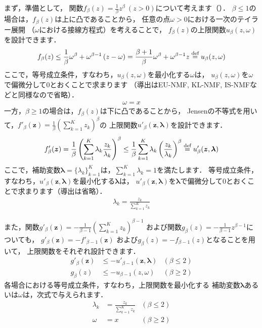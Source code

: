 まず，準備として，
関数$f_\beta(z)=\frac{1}{\beta} z^\beta \ (z > 0)$について考えます（）．
$\beta \le 1$の場合は，$f_\beta(z)$は上に凸であることから，
任意の点$\omega > 0$における一次のテイラー展開
（$\omega$における接線方程式）を考えることで，
$f_\beta(z)$の上限関数$u_\beta(z,\omega)$を設計できます．
\begin{align}
f_\beta(z)
\le
\frac{1}{\beta} \omega^\beta + \omega^{\beta - 1}\left(z - \omega\right)
=
\frac{\beta + 1}{\beta} \omega^\beta + \omega^{\beta - 1} z
\overset{\mbox{\scriptsize{def}}}{=}
u_\beta(z,\omega)
\end{align}
ここで，等号成立条件，すなわち，$u_\beta(z,\omega)$を最小化する$\omega$は，
$u_\beta(z,\omega)$を$\omega$で偏微分して$0$とおくことで求まります
（導出はEU-NMF, KL-NMF, IS-NMFなどと同様なので省略）．
\begin{align}
\omega = x
\end{align}
一方，$\beta \ge 1$の場合は，$f_\beta(z)$は下に凸であることから，
Jensenの不等式を用いて，$f'_\beta(\bm{z}) = \frac{1}{\beta} \left(\sum_{k=1}^K z_k\right)^\beta$の
上限関数$u'_\beta(\bm{z},\bm\lambda)$を設計できます．
\begin{align}
f'_\beta(\bm{z}) 
= 
\frac{1}{\beta} \left(\sum_{k=1}^K \lambda_k \frac{z_k}{\lambda_k}\right)^\beta
\le 
\frac{1}{\beta} \sum_{k=1}^K \lambda_k \left(\frac{z_k}{\lambda_k}\right)^\beta
\overset{\mbox{\scriptsize{def}}}{=}
u'_\beta(\bm{z},\bm\lambda)
\end{align}
ここで，補助変数$\bm\lambda = \{\lambda_k\}_{k=1}^K$は，$\sum_{k=1}^K \lambda_k = 1$を満たします．
等号成立条件，すなわち，$u'_\beta(\bm{z},\bm\lambda)$を最小化する$\bm\lambda$は，
$u'_\beta(\bm{z},\bm\lambda)$を$\bm\lambda$で偏微分して$0$とおくことで求まります（導出は省略）．
\begin{align}
\lambda_k = \frac{z_k}{\sum_{k=1}^K z_k}
\end{align}

また，関数$g'_\beta(\bm{z})
= - \frac{1}{\beta - 1} \left(\sum_{k=1}^K z_k\right)^{\beta - 1}$
および関数$g_\beta(z) = - \frac{1}{\beta - 1} z^{\beta - 1}$についても，
$g'_\beta(\bm{z}) = - f'_{\beta-1}(\bm{z})$
および$g_\beta(z) = - f_{\beta-1}(z)$となることを用いて，
上限関数をそれぞれ設計できます．
\begin{align}
g'_\beta(\bm{z}) &\le - u'_{\beta - 1}(\bm{z},\bm\lambda)
&(\beta \le 2)
\\
g_\beta(z) &\le - u_{\beta - 1}(z,\omega)
&(\beta \ge 2)
\end{align}
各場合における等号成立条件，すなわち，上限関数を最小化する
補助変数$\bm\lambda$あるいは$\omega$は，次式で与えられます．
\begin{align}
\lambda_k &= \frac{z_k}{\sum_{k=1}^K z_k} &(\beta \le 2)
\\
\omega &= x &(\beta \ge 2)
\end{align}

